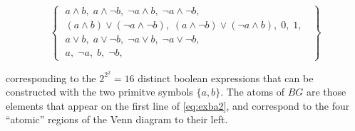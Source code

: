 \documentclass{article}
\begin{document}
\begin{example}
\begin{minipage}{0.3\textwidth}
\begin{center}
                \label{fig:ven2BA}
            \end{center}
        \end{minipage}\begin{minipage}{0.65\textwidth}
            \begin{equation} \left\{\;
                \begin{aligned}
                    a \land b,\; a \land \lnot b,\; \lnot a \land b,\; \lnot a \land \lnot b,\; \\
                    (a\land b) \lor(\lnot a \land \lnot b),\; (a\land \lnot b) \lor (\lnot a \land b),\; 0,\; 1,\;\\
                    a \lor b,\; a \lor \lnot b,\;  \lnot a \lor b,\; \lnot a \lor \lnot b,\; \\
                    a,\; \lnot a,\; b,\; \lnot b,\;
                \end{aligned}\;
                \right\} \label{eq:exba2} \end{equation}
        \end{minipage}
        \par\smallskip\noindent
        corresponding to the $2^{2^2} = 16$ distinct boolean expressions that can be constructed with the two primitve symbols $\{a, b\}$. The atoms of $BG$ are those elements that appear on the first line of \eqref{eq:exba2}, and correspond to the four ``atomic'' regions of the Venn diagram to their left.
    \end{example}
\end{document}
